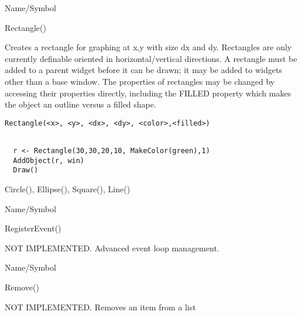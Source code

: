 \rl



\begin{desc}{Name/Symbol}
\item[Name/Symbol]	Rectangle()
  
\item[Description]	Creates a rectangle for graphing at x,y with size
  dx and dy. Rectangles are only currently definable oriented in
  horizontal/vertical directions.  A rectangle  must be added
  to a parent widget before it can be drawn; it may be added to
  widgets other than a base window.  The properties of rectangles may be
  changed by accessing their properties directly, including the FILLED
  property which makes the object an outline versus a filled shape.

\item[Usage]
\begin{verbatim}
Rectangle(<x>, <y>, <dx>, <dy>, <color>,<filled>)
\end{verbatim}

\item[Example]	
\begin{verbatim}
  
  r <- Rectangle(30,30,20,10, MakeColor(green),1)
  AddObject(r, win)
  Draw()

\end{verbatim}
\item[See Also]	 Circle(), Ellipse(), Square(), Line()
\end{desc}

\rl




\begin{desc}{Name/Symbol}
\item[Name/Symbol]  	RegisterEvent()

\item[Description]	NOT IMPLEMENTED.  Advanced event loop management.

\item[Usage]		

\item[Example]	

\item[See Also]	
\end{desc}

\rl






\begin{desc}{Name/Symbol}
\item[Name/Symbol]  	Remove()

\item[Description]  	NOT IMPLEMENTED.  Removes an item from a list

\item[Usage]		

\item[Example]	

\item[See Also]	
\end{desc}

